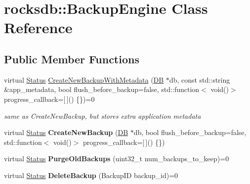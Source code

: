 \hypertarget{classrocksdb_1_1BackupEngine}{}\section{rocksdb\+:\+:Backup\+Engine Class Reference}
\label{classrocksdb_1_1BackupEngine}
\subsection*{Public Member Functions}
\begin{DoxyCompactItemize}
\item 
virtual \hyperlink{classrocksdb_1_1Status}{Status} \hyperlink{classrocksdb_1_1BackupEngine_a334add83bac85feb928064dbee0f90b9}{Create\+New\+Backup\+With\+Metadata} (\hyperlink{classrocksdb_1_1DB}{DB} $\ast$db, const std\+::string \&app\+\_\+metadata, bool flush\+\_\+before\+\_\+backup=false, std\+::function$<$ void()$>$ progress\+\_\+callback=\mbox{[}$\,$\mbox{]}() \{\})=0\hypertarget{classrocksdb_1_1BackupEngine_a334add83bac85feb928064dbee0f90b9}{}\label{classrocksdb_1_1BackupEngine_a334add83bac85feb928064dbee0f90b9}

\begin{DoxyCompactList}\small\item\em same as Create\+New\+Backup, but stores extra application metadata \end{DoxyCompactList}\item 
virtual \hyperlink{classrocksdb_1_1Status}{Status} {\bfseries Create\+New\+Backup} (\hyperlink{classrocksdb_1_1DB}{DB} $\ast$db, bool flush\+\_\+before\+\_\+backup=false, std\+::function$<$ void()$>$ progress\+\_\+callback=\mbox{[}$\,$\mbox{]}() \{\})\hypertarget{classrocksdb_1_1BackupEngine_ae4caf7171f3980e4471d10eb784261bd}{}\label{classrocksdb_1_1BackupEngine_ae4caf7171f3980e4471d10eb784261bd}

\item 
virtual \hyperlink{classrocksdb_1_1Status}{Status} {\bfseries Purge\+Old\+Backups} (uint32\+\_\+t num\+\_\+backups\+\_\+to\+\_\+keep)=0\hypertarget{classrocksdb_1_1BackupEngine_a609107b69c9115182ac9e6007e971fc2}{}\label{classrocksdb_1_1BackupEngine_a609107b69c9115182ac9e6007e971fc2}

\item 
virtual \hyperlink{classrocksdb_1_1Status}{Status} {\bfseries Delete\+Backup} (Backup\+ID backup\+\_\+id)=0\hypertarget{classrocksdb_1_1BackupEngine_a92eebbe0e8a93221f2aadba43f0c426f}{}\label{classrocksdb_1_1BackupEngine_a92eebbe0e8a93221f2aadba43f0c426f}


\end{DoxyCompactItemize}
